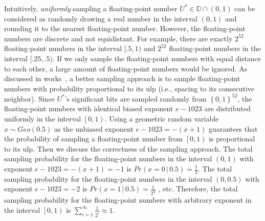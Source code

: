 Intuitively, \textit{uniformly} sampling a floating-point number $U^{*}\in\mathbb{D} \cap \left(0,1\right) $ can be considered as randomly drawing a real number in the interval $\left(0,1\right) $ and rounding it to the nearest floating-point number. However, the floating-point numbers are discrete and not equidistant. For example, there are exactly $2^{52}$ floating-point numbers in the interval $[.5, 1)$ and $2^{52}$ floating-point numbers in the interval $[ .25, .5)$. If we only sample the floating-point numbers with equal distance to each other, a large amount of floating-point numbers would be ignored.
As discussed in works~\cite{walker1974fast,mironov2012significance}, a better sampling approach is to sample floating-point numbers with probability proportional to its ulp (i.e., spacing to its consecutive neighbor).
Since $U^{*}$'s significant bits are sampled randomly from $\left\{0,1\right\}^{52} $, the floating-point numbers with identical biased exponent $e-1023$ are distributed uniformly in the interval $\left[0,1\right) $.
Using a geometric random variable $x \sim Geo\left(0.5\right) $ as the unbiased exponent $e-1023=-\left(x+1\right) $ guarantees that the probability of sampling a floating-point number from $\left[0,1\right) $ is proportional to its ulp.
Then we discuss the correctness of the sampling approach.
The total sampling probability for the floating-point numbers in the interval $(0,1)$ with exponent $e-1023=-\left(x+1\right) =-1$ is $Pr\left(x=0 \,|\,0.5\right) =\frac{1}{2}$.
The total sampling probability for the floating-point numbers in the interval $(0,0.5)$ with exponent $e-1023=-2$ is $Pr\left(x=1\,|\,0.5\right) =\frac{1}{2^2}$ , etc.
Therefore, the total sampling probability for the floating-point numbers with arbitrary exponent in the interval $\left[0,1\right)$ is $\sum_{i = 1}^{\infty}\frac{1}{2^{i}}\approx 1$.



